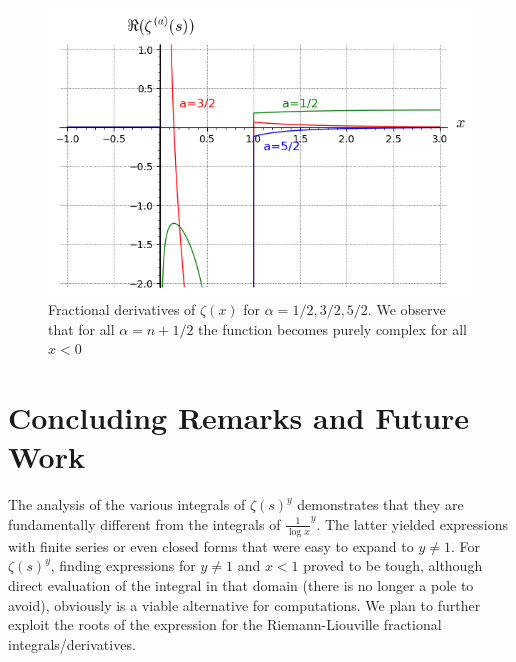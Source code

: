 \documentclass[a4paper,11pt,twoside]{amsart}
\begin{document}
\begin{figure}[H]
  \includegraphics[width=0.9\linewidth]{fracderzeta.png}
  \caption{Fractional derivatives of $\zeta(x)$ for $\alpha=1/2, 3/2, 5/2$. We observe that for all $\alpha = n + 1/2$ the function becomes purely complex for all $ x < 0$}
\end{figure}

  
\section{Concluding Remarks and Future Work}

The analysis of the various integrals of $\zeta(s)^y$ demonstrates that they are fundamentally different from the integrals of $\frac{1}{\log x}^y$. The latter yielded expressions with finite series or even closed forms that were easy to expand to $y \ne 1$. For $\zeta(s)^{y}$, finding expressions for $y \ne 1$ and $x < 1$ proved to be tough, although direct evaluation of the integral in that domain (there is no longer a pole to avoid), obviously is a viable alternative for computations. We plan to further exploit the roots of the expression for the Riemann-Liouville fractional integrals/derivatives.
\end{document}
